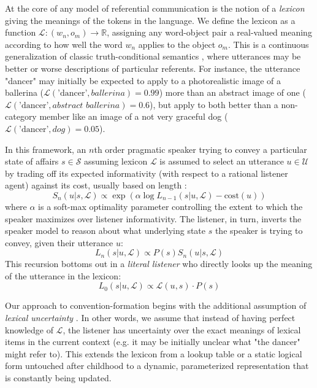 At the core of any model of referential communication is the notion of a \emph{lexicon} giving the meanings of the tokens in the language. 
We define the lexicon as a function $\mathcal{L}: (w_n, o_m) \rightarrow \mathbb{R}$, assigning any word-object pair a real-valued meaning according to how well the word $w_n$ applies to the object $o_m$. 
This is a continuous generalization of classic truth-conditional semantics , where utterances may be better or worse descriptions of particular referents. 
For instance, the utterance "dancer" may initially be expected to apply to a photorealistic image of a ballerina ($\mathcal{L}(\textrm{'dancer'}, \textit{ballerina}) = 0.99$) more than an abstract image of one ($\mathcal{L}(\textrm{'dancer'}, \textit{abstract ballerina}) =0.6$), but apply to both better than a non-category member like an image of a not very graceful dog ($\mathcal{L}(\textrm{'dancer'}, \textit{dog}) = 0.05$).

In this framework, an $n$th order pragmatic speaker trying to convey a particular state of affairs $s \in \mathcal{S}$ assuming lexicon $\mathcal{L}$ is assumed to select an utterance $u \in \mathcal{U}$ by trading off its expected informativity (with respect to a rational listener agent) against its cost, usually based on length \cite{GoodmanFrank16_RSATiCS}:
$$S_n(u | s, \mathcal{L}) \propto \exp{\left(\alpha \log L_{n-1}(s | u, \mathcal{L}) - \textrm{cost}(u)\right)}$$
where $\alpha$ is a soft-max optimality parameter controlling the extent to which the speaker maximizes over listener informativity. The listener, in turn, inverts the speaker model to reason about what underlying state $s$ the speaker is trying to convey, given their utterance $u$:
$$L_n(s | u, \mathcal{L}) \propto P(s) S_{n}(u | s, \mathcal{L})$$
\indent This recursion bottoms out in a \emph{literal listener} who directly looks up the meaning of the utterance in the lexicon:
$$L_0(s | u, \mathcal{L}) \propto \mathcal{L}(u, s)\cdot P(s)$$

Our approach to convention-formation begins with the additional assumption of \emph{lexical uncertainty} \cite{SmithGoodmanFrank13_RecursivePragmaticReasoningNIPS,BergenLevyGoodman16_LexicalUncertainty}. 
In other words, we assume that instead of having perfect knowledge of $\mathcal{L}$, the listener has uncertainty over the exact meanings of lexical items in the current context (e.g. it may be initially unclear what "the dancer" might refer to). 
This extends the lexicon from a lookup table or a static logical form untouched after childhood to a dynamic, parameterized representation that is constantly being updated.

